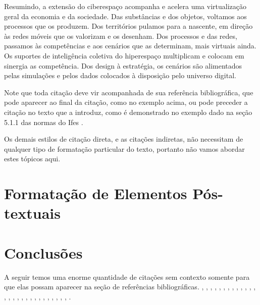 \documentclass[times,english,brazil,oneside,section=TITLE]{ifes8}
\begin{document}
\begin{citacao}
  Resumindo, a extensão do ciberespaço acompanha e acelera uma
  virtualização geral da economia e da sociedade. Das substâncias e
  dos objetos, voltamos aos processos que os produzem. Dos territórios
  pulamos para a nascente, em direção às redes móveis que os valorizam
  e os desenham. Dos processos e das redes, passamos às competências e
  aos cenários que as determinam, mais virtuais ainda. Os suportes de
  inteligência coletiva do hiperespaço multiplicam e colocam em
  sinergia as competência. Dos design à estratégia, os cenários são
  alimentados pelas simulações e pelos dados colocados à disposição
  pelo universo digital. \cite{Levy1999}
\end{citacao}

Note que toda citação deve vir acompanhada de sua referência
bibliográfica, que pode aparecer ao final da citação, como no exemplo
acima, ou pode preceder a citação no texto que a introduz, como é
demonstrado no exemplo dado na seção 5.1.1 das normas do Ifes
\cite[p.~39]{Ifes2017}.

Os demais estilos de citação direta, e as citações indiretas, não
necessitam de qualquer tipo de formatação particular do texto,
portanto não vamos abordar estes tópicos aqui.



\chapter{Formatação de Elementos Pós-textuais}
\label{cha:format-pos-text}



\chapter{Conclusões}

A seguir temos uma enorme quantidade de citações sem contexto somente
para que elas possam aparecer na seção de referências bibliográficas.
\cite{abntex2classe}, \cite{abntex2-wiki-como-customizar},
\cite{abntex2modelo-artigo}, \cite{abntex2modelo-relatorio},
\cite{abntex2modelo}, \cite{abntex2cite}, \cite{abntex2cite-alf},
\cite{Ifes2017}, \cite{NBR6024:2012}, \cite{araujo2012},
\cite{talbot2012}, \cite{NBR14724:2011}, \cite{EIA649B},
\cite{bates2010}, \cite{memoir}, \cite{masolo2010}, \cite{babel},
\cite{NBR14724:2005}, \cite{macedo2005}, \cite{guizzardi2005},
\cite{NBR6028:2003}, \cite{NBR10520:2002}, \cite{NBR14724:2002},
\cite{NBR14724:2001}, \cite{guarino1995}, \cite{ibge1993},
\cite{van86}, \cite{dewey1980}, \cite{doxiadis1965}.
\end{document}

